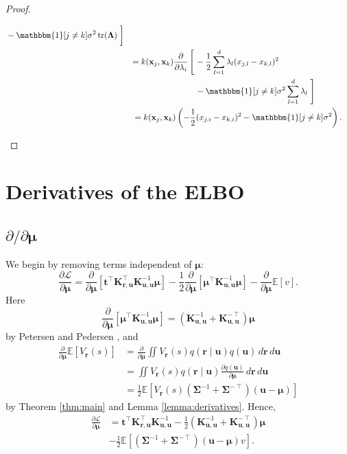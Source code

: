 \documentclass{mpaper}
\DeclareMathOperator{\tr}{tr}
\newcommand{\V}{V_{\mathbf{r}}}
\newcommand{\dx}{\,d\mathbf{r}\,d\mathbf{u}}
\newcommand{\Kuu}{\mathbf{K}_{\mathbf{u},\mathbf{u}}}
\newcommand{\Kru}{\mathbf{K}_{\mathbf{r},\mathbf{u}}}
\newcommand{\dm}{\frac{\partial}{\partial\bm\mu}}
\newcommand{\dl}{\frac{\partial}{\partial \lambda_i}}
\begin{document}
\begin{proof}
\begin{enumerate}
\begin{enumerate}
\begin{align*}
\begin{aligned}
        &- \mathbbm{1}[j \ne k]\sigma^2\tr(\bm\Lambda) \left. \vphantom{\frac{1}{2}} \right]
      \end{aligned} \\
      &\begin{aligned}
        = k(\mathbf{x}_j, \mathbf{x}_k) \dl \left[ \vphantom{\sum_{k=1}^d} \right. &-\frac{1}{2} \sum_{l=1}^d \lambda_l (x_{j,l} - x_{k,l})^2 \\
        &- \mathbbm{1}[j \ne k]\sigma^2\sum_{l=1}^d \lambda_l \left. \vphantom{\sum_{l=1}^d} \right]
      \end{aligned} \\
      &= k(\mathbf{x}_j, \mathbf{x}_k) \left( -\frac{1}{2}(x_{j,i} - x_{k,i})^2 - \mathbbm{1}[j \ne k]\sigma^2 \right).
    \end{align*}
    \end{enumerate}
  \end{enumerate}
\end{proof}

\section{Derivatives of the ELBO}

\subsection{\texorpdfstring{$\partial/\partial\bm\mu$}{Derivative w.r.t. mu}}

We begin by removing terms independent of $\bm\mu$:
\[
  \frac{\partial\mathcal{L}}{\partial\bm\mu} =
  \dm[\mathbf{t}^\intercal\Kru^\intercal\Kuu^{-1}\bm\mu] - \frac{1}{2} \dm
  \left[ \bm\mu^\intercal \Kuu^{-1} \bm\mu \right] - \dm\mathbb{E}[v].
\]
Here
\[
  \dm \left[ \bm\mu^\intercal \Kuu^{-1} \bm\mu \right] = (\Kuu^{-1} +
  \Kuu^{-\intercal}) \bm\mu
\]
by Petersen and Pedersen \cite{petersen2008matrix}, and
\[
  \begin{split}
    \dm\mathbb{E}[\V(s)] &= \dm\iint \V(s) q(\mathbf{r} \mid \mathbf{u})
    q(\mathbf{u})\dx \\
    &= \iint \V(s) q(\mathbf{r} \mid \mathbf{u}) \frac{\partial
      q(\mathbf{u})}{\partial \bm\mu}\dx \\
    &= \frac{1}{2}\mathbb{E}[\V(s) (\bm\Sigma^{-1} +
    \bm\Sigma^{-\intercal})(\mathbf{u} - \bm\mu)]
  \end{split}
\]
by Theorem \ref{thm:main} and Lemma \ref{lemma:derivatives}. Hence,
\[
  \begin{split}
    \frac{\partial\mathcal{L}}{\partial\bm\mu} &=
    \mathbf{t}^\intercal\Kru^\intercal\Kuu^{-1} - \frac{1}{2} (\Kuu^{-1} +
    \Kuu^{-\intercal}) \bm\mu \\
    &- \frac{1}{2}\mathbb{E} \left[(\bm\Sigma^{-1} +
      \bm\Sigma^{-\intercal})(\mathbf{u} - \bm\mu) v \right].
  \end{split}
\]
\end{document}
